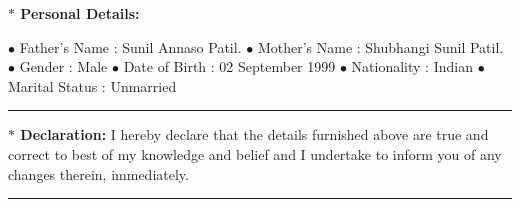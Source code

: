 \documentclass[a4paper,11pt]{article} %
\begin{document}
			\textbf{\large $\ast$ Personal Details:\medskip}{
			
			$\bullet$ Father's Name : Sunil Annaso Patil.\newline
			$\bullet$ Mother's Name : Shubhangi Sunil Patil.\newline
			$\bullet$ Gender : Male \newline
			$\bullet$ Date of Birth : 02 September 1999 \newline
			$\bullet$ Nationality : Indian \newline
			$\bullet$ Marital Status : Unmarried \newline
			
			}

\hrule	
\bigskip

\textbf{\large $\ast$ Declaration:} 
I hereby declare that the details furnished above are true and correct to best of my knowledge and belief and I undertake to inform you of any changes therein, immediately.\linebreak\linebreak


\hrule	
\bigskip
\end{document}
